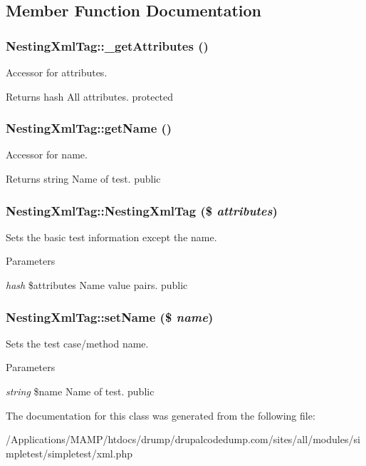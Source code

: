 \subsection{Member Function Documentation}
\hypertarget{class_nesting_xml_tag_a4f77ec31908ff25ccf780aa1a6d648e2}{
\subsubsection[{\_\-getAttributes}]{\setlength{\rightskip}{0pt plus 5cm}NestingXmlTag::\_\-getAttributes ()}}
\label{class_nesting_xml_tag_a4f77ec31908ff25ccf780aa1a6d648e2}
Accessor for attributes. \begin{DoxyReturn}{Returns}
hash All attributes.  protected 
\end{DoxyReturn}
\hypertarget{class_nesting_xml_tag_aea10453a4bf92a0133dcab1138ff6532}{
\subsubsection[{getName}]{\setlength{\rightskip}{0pt plus 5cm}NestingXmlTag::getName ()}}
\label{class_nesting_xml_tag_aea10453a4bf92a0133dcab1138ff6532}
Accessor for name. \begin{DoxyReturn}{Returns}
string Name of test.  public 
\end{DoxyReturn}
\hypertarget{class_nesting_xml_tag_a0d2f0d6d0117c92b40b664d003dda596}{
\subsubsection[{NestingXmlTag}]{\setlength{\rightskip}{0pt plus 5cm}NestingXmlTag::NestingXmlTag (\$ {\em attributes})}}
\label{class_nesting_xml_tag_a0d2f0d6d0117c92b40b664d003dda596}
Sets the basic test information except the name. 
\begin{DoxyParams}{Parameters}
\item[{\em hash}]\$attributes Name value pairs.  public \end{DoxyParams}
\hypertarget{class_nesting_xml_tag_ae7fcd8fbe018cf263f09e4a4532dd429}{
\subsubsection[{setName}]{\setlength{\rightskip}{0pt plus 5cm}NestingXmlTag::setName (\$ {\em name})}}
\label{class_nesting_xml_tag_ae7fcd8fbe018cf263f09e4a4532dd429}
Sets the test case/method name. 
\begin{DoxyParams}{Parameters}
\item[{\em string}]\$name Name of test.  public \end{DoxyParams}


The documentation for this class was generated from the following file:\begin{DoxyCompactItemize}
\item 
/Applications/MAMP/htdocs/drump/drupalcodedump.com/sites/all/modules/simpletest/simpletest/xml.php\end{DoxyCompactItemize}
